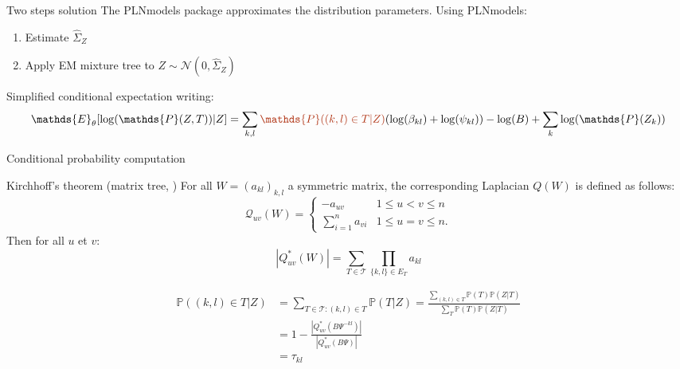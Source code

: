 \documentclass[9pt]{beamer}
\newcommand{\emphase}[1]{\textcolor{Complement}{#1}}
\begin{document}
\begin{frame}{Two steps solution}
   The {\selectfont
PLNmodels} package approximates the distribution parameters. Using {\selectfont
PLNmodels}:
    \vspace{0.3cm}
    \begin{enumerate}
        \item Estimate $\hat{\Sigma}_Z$ \vspace{0.2cm}
        \item Apply EM mixture tree to $Z \sim \mathcal{N}(0,\hat{\Sigma}_Z)$\\
    \end{enumerate}
\vspace{1.5cm}
Simplified conditional expectation writing:\\
\vspace{0.2cm}
\[\mathds{E}_\theta[\log(\mathds{P}(Z,T))|Z] =\sum_{k,l}  \emphase{\mathds{P}((k,l) \in T|Z)}(\log(\beta_{kl}) + \log(\psi_{kl}) )-\log(B) +\sum_k \log(\mathds{P}(Z_k))\]
\end{frame}

\begin{frame}{Conditional probability computation}
\begin{exampleblock}{Kirchhoff's theorem (matrix tree, \cite{AiH89})}
For all $W=(a_{kl})_{k,l}$ a symmetric matrix, the corresponding Laplacian $Q(W)$ is defined as follows:
 \[\mathcal{Q}_{uv}(W)=
 \begin{cases}
     -a_{uv} & 1\leq u<v \leq n\\
    \sum_{i=1}^n a_{vi} & 1\leq u=v \leq n.
\end{cases}
\]
Then for all $u$ et $v$:
    \[ |Q^*_{uv}(W)|=\sum_{T\in\mathcal{T}} \prod_{\{k,l\}\in E_T} a_{kl} \]
\end{exampleblock}
\begin{align*}
  \mathds{P}((k,l)\in T | Z)&=\sum_{T\in \mathcal{T} : (k,l)\in T}\mathds{P}( T | Z) = \frac{\sum_{(k,l)\in T} \mathds{P}(T)\mathds{P}(Z|T)}{\sum_{T} \mathds{P}(T)\mathds{P}(Z|T)}\\
 &=1- \frac{|Q^*_{uv}(B\Psi^{-kl})|}{|Q^*_{uv}(B\Psi)|}\\
 &= \tau_{kl}
 \end{align*}
 
\end{frame}
\end{document}
